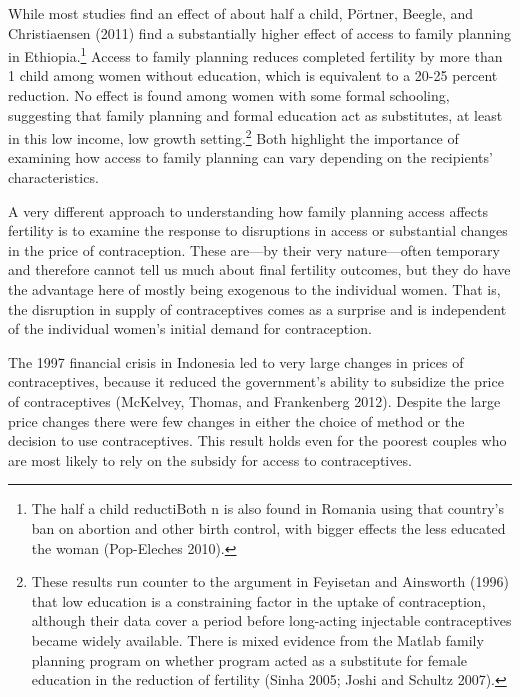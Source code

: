 \documentclass[]{article}
\begin{document}
While most studies find an effect of about half a child, Pörtner, Beegle, and Christiaensen (2011) find a substantially higher effect of access to family planning in Ethiopia.\footnote{The half a child reductiBoth n is also found in Romania using that country's ban on abortion and other birth control, with bigger effects the less educated the woman (Pop-Eleches 2010).} Access to family planning reduces completed fertility by more than 1 child among women without education, which is equivalent to a 20-25 percent reduction. No effect is found among women with some formal schooling, suggesting that family planning and formal education act as substitutes, at least in this low income, low growth setting.\footnote{These results run counter to the argument in Feyisetan and Ainsworth (1996) that low education is a constraining factor in the uptake of contraception, although their data cover a period before long-acting injectable contraceptives became widely available. There is mixed evidence from the Matlab family planning program on whether program acted as a substitute for female education in the reduction of fertility (Sinha 2005; Joshi and Schultz 2007).} Both highlight the importance of examining how access to family planning can vary depending on the recipients' characteristics.

A very different approach to understanding how family planning access affects fertility is to examine the response to disruptions in access or substantial changes in the price of contraception. These are---by their very nature---often temporary and therefore cannot tell us much about final fertility outcomes, but they do have the advantage here of mostly being exogenous to the individual women. That is, the disruption in supply of contraceptives comes as a surprise and is independent of the individual women's initial demand for contraception.

The 1997 financial crisis in Indonesia led to very large changes in prices of contraceptives, because it reduced the government's ability to subsidize the price of contraceptives (McKelvey, Thomas, and Frankenberg 2012). Despite the large price changes there were few changes in either the choice of method or the decision to use contraceptives. This result holds even for the poorest couples who are most likely to rely on the subsidy for access to contraceptives.
\end{document}
